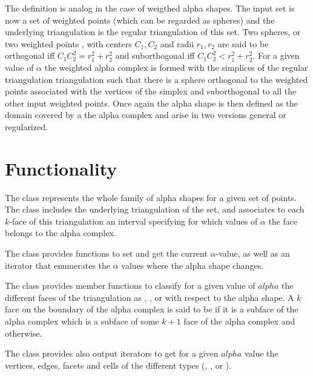 The definition is analog in the case of weigthed alpha shapes.
The input set is now a set of weighted points (which can be regarded
as spheres) and the underlying triangulation 
is the regular triangulation of this set.
Two spheres, or two weighted points , with centers $C_1, C_2$
and  radii $r_1, r_2 $ are said to be orthogonal iff 
$ C_1C_2 ^2 = r_1^2 + r_2^2$ and suborthogonal
iff  $ C_1C_2 ^2 < r_1^2 + r_2^2$.
For a given value of $\alpha$
the weighted alpha complex is formed with the simplices of the 
regular triangulation triangulation
such that there is a sphere orthogonal to the weighted points associated
with the vertices of the simplex  and suborthogonal to all the other
input weighted points. Once again the alpha shape is then defined as
the domain covered by a the alpha complex and arise in two versions
general or regularized.





\section{Functionality \label{I1_SectAlpha_Shape_3}}

The class  represents the whole
family of alpha shapes for a given set of points.
The class includes  the underlying triangulation 
of the set,  and associates to each $k$-face of this triangulation
 an interval specifying 
for which values of $\alpha$ the face belongs to the
alpha complex. 


The class  provides functions to set and
get the current $\alpha$-value, as well as an iterator that enumerates
the $\alpha$ values where the alpha shape changes.

The class provides member functions to classify for a given value
of $alpha$ the different faces of the triangulation as
, ,  or 
 with respect
to the alpha shape. A $k$ face  on the boundary of the alpha complex
is said to be   if it is a subface of the alpha complex
which is  a subface of some $k+1$ face of the alpha complex
and  otherwise.

The class  provides also output iterators  to  get for a given $alpha$ value
the vertices, edges, facets and cells of the different types
(, ,  or 
).


